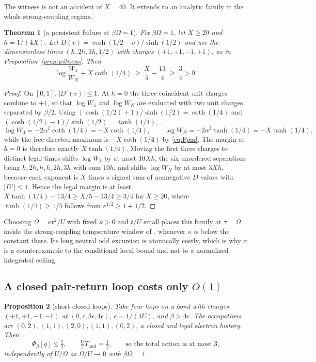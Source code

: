 \documentclass[11pt]{article}
\newtheorem{theorem}{Theorem}[section]
\newtheorem{proposition}[theorem]{Proposition}
\theoremstyle{definition}
\theoremstyle{remark}
\begin{document}
The witness is not an accident of $X=40$. It extends to an analytic family in the
whole strong-coupling regime.

\begin{theorem}[a persistent failure at $\beta\Omega=1$]
\label{thm:family}
Fix $\beta\Omega=1$, let $X\ge20$ and $h=1/(4X)$. Let $D(v)=\cosh(1/2-v)/\sinh(1/2)$
and use the dimensionless times $(h,2h,3h,1/2)$ with charges $(+1,+1,-1,+1)$, as
in Proposition~\ref{prop:witness}. Then
\begin{equation}
\log\frac{W_{4}}{W_{N}}+X\coth(1/4)\ \ge\ \frac{X}{5}-\frac{13}{4}\ \ge\ \frac34>0 .
\label{eq:family}
\end{equation}
\end{theorem}

\begin{proof}
On $[0,1]$, $|D'(v)|\le1$. At $h=0$ the three coincident unit charges combine to
$+1$, so that $\log W_{4}$ and $\log W_{N}$ are evaluated with two unit charges
separated by $\beta/2$. Using $(\cosh(1/2)+1)/\sinh(1/2)=\coth(1/4)$ and
$(\cosh(1/2)-1)/\sinh(1/2)=\tanh(1/4)$,
\[
\log W_{4}=-2\alpha^{2}\coth(1/4)=-X\coth(1/4), \qquad
\log W_{N}=-2\alpha^{2}\tanh(1/4)=-X\tanh(1/4),
\]
while the free directed maximum is $-X\coth(1/4)$ by \eqref{eq:Fpm}. The margin at
$h=0$ is therefore exactly $X\tanh(1/4)$. Moving the first three charges to
distinct legal times shifts $\log W_{4}$ by at most $10Xh$, the six unordered
separations being $h,2h,h,h,2h,3h$ with sum $10h$, and shifts $\log W_{N}$ by at
most $3Xh$, because each exponent is $X$ times a signed sum of nonnegative
$D$ values with $|D'|\le1$. Hence the legal margin is at least
$X\tanh(1/4)-13/4\ge X/5-13/4\ge3/4$ for $X\ge20$, where $\tanh(1/4)\ge1/5$
follows from $e^{1/2}\ge1+1/2$.
\end{proof}

Choosing $\Omega=\kappa t^{2}/U$ with fixed $\kappa>0$ and $t/U$ small places this
family at $\tau=\Omega$ inside the strong-coupling temperature window of
\cite{largeu,strong}, whenever $\kappa$ is below the constant there. Its long
neutral odd excursion is atomically costly, which is why it is a counterexample to
the conditional local bound and not to a normalized integrated ceiling.

\subsection{A closed pair-return loop costs only \texorpdfstring{$O(1)$}{O(1)}}

\begin{proposition}[short closed loops]
\label{prop:loop}
Take four hops on a bond with charges $(+1,+1,-1,-1)$ at $(0,\epsilon,3\epsilon,4\epsilon)$,
$\epsilon=1/(4U)$, and $\beta>4\epsilon$. The occupations are
$(0,2),(1,1),(2,0),(1,1),(0,2)$, a closed and legal electron history. Then
\begin{equation}
\Phi_{\beta}[q]\le\tfrac52,\qquad \tfrac U2T_{\mathrm{odd}}=\tfrac12,
\qquad\text{so the total action is at most }3,
\label{eq:loop}
\end{equation}
independently of $U/\Omega$ as $\Omega/U\to0$ with $\beta\Omega=1$.
\end{proposition}
\end{document}
